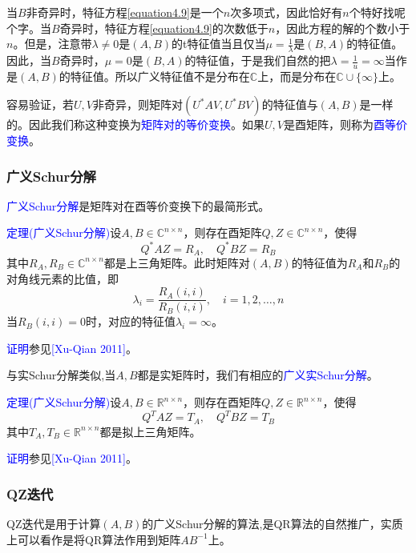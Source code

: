 \documentclass[12pt,a4paper]{article}
\begin{document}
当$B$非奇异时，特征方程\ref{equation4.9}是一个$n$次多项式，因此恰好有$n$个特好找呢个字。当$B$奇异时，特征方程\ref{equation4.9}的次数低于$n$，因此方程的解的个数小于$n$。但是，注意带$\lambda \neq 0$是$(A,B)$的t特征值当且仅当$\mu=\frac{1}{\lambda}$是$(B, A)$的特征值。因此，当$B$奇异时，$\mu=0$是$(B, A)$的特征值，于是我们自然的把$\lambda=\frac{1}{u}=\infty$当作是$(A,B)$的特征值。所以广义特征值不是分布在$\mathbb{C}$上，而是分布在$\mathbb{C} \cup\{\infty\}$上。

容易验证，若$U,V$非奇异，则矩阵对$\left(U^{*} A V, U^{*} B V\right)$的特征值与$(A,B)$是一样的。因此我们称这种变换为\textcolor{blue}{矩阵对的等价变换}。如果$U,V$是酉矩阵，则称为\textcolor{blue}{酉等价变换}。
\subsubsection{广义Schur分解}
\textcolor{blue}{广义Schur分解}是矩阵对在酉等价变换下的最简形式。

\textcolor{blue}{定理(广义Schur分解)}\quad 设$A, B \in \mathbb{C}^{n \times n}$，则存在酉矩阵$Q, Z \in \mathbb{C}^{n \times n}$，使得\begin{equation}
Q^{*} A Z=R_{A}, \quad Q^{*} B Z=R_{B}
\end{equation}其中$R_{A}, R_{B} \in \mathbb{C}^{n \times n}$都是上三角矩阵。此时矩阵对$(A,B)$的特征值为$R_A$和$R_B$的对角线元素的比值，即$$
\lambda_{i}=\frac{R_{A}(i, i)}{R_{B}(i, i)}, \quad i=1,2, \ldots, n
$$当$R_{B}(i, i)=0$时，对应的特征值$\lambda_{i}=\infty$。

\textcolor{blue}{证明}参见\textcolor{blue}{[Xu-Qian 2011]}。

与实Schur分解类似,当$A,B$都是实矩阵时，我们有相应的\textcolor{blue}{广义实Schur分解}。

\textcolor{blue}{定理(广义Schur分解)}\quad 设$A, B \in \mathbb{R}^{n \times n}$，则存在酉矩阵$Q, Z \in \mathbb{R}^{n \times n}$，使得\begin{equation}
Q^{T} A Z=T_{A}, \quad Q^{T} B Z=T_{B}
\end{equation}其中$T_{A}, T_{B} \in \mathbb{R}^{n \times n}$都是拟上三角矩阵。

\textcolor{blue}{证明}参见\textcolor{blue}{[Xu-Qian 2011]}。

\subsubsection{QZ迭代}
QZ迭代是用于计算$(A,B)$的广义Schur分解的算法,是QR算法的自然推广，实质上可以看作是将QR算法作用到矩阵$AB^{-1}$上。
\end{document}
